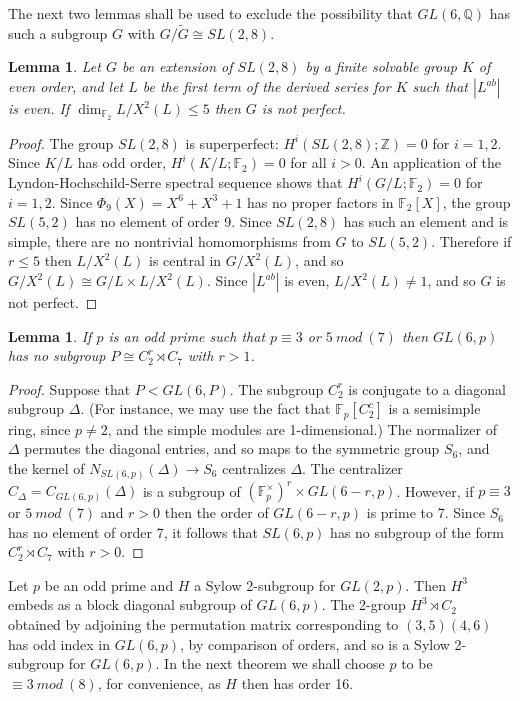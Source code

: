 \documentclass[12pt]{amsart}
\renewcommand{\leq}{\leqslant}
\newtheorem{lemma}[theorem]{Lemma}
\begin{document}
The next two lemmas shall be used to exclude the possibility that 
$GL(6,\mathbb{Q})$ has such a subgroup $G$ with $G/\widetilde{G}\cong{SL(2,8)}$.

\begin{lemma}
\label{small 2gp}
Let $G$ be an extension of $SL(2,8)$ by a finite solvable group $K$ 
of even order, and let $L$ be the first term of the derived series for $K$ 
such that $|L^{ab}|$ is even.
If $\dim_{\mathbb{F}_2}L/X^2(L)\leq5$ then $G$ is not perfect.
\end{lemma}

\begin{proof}
The group $SL(2,8)$ is superperfect: $H^i(SL(2,8);\mathbb{Z})=0$ for $i=1,2$.
Since $K/L$ has odd order,  $H^i(K/L;\mathbb{F}_2)=0$ for all $i>0$.
An application of the Lyndon-Hochschild-Serre spectral sequence shows that 
 $H^i(G/L;\mathbb{F}_2)=0$ for $i=1,2$.
Since $\Phi_9(X)=X^6+X^3+1$ has no proper factors in $\mathbb{F}_2[X]$,
the group $SL(5,2)$ has no element of order 9.
Since $SL(2,8)$ has such an element and is simple,
there are no nontrivial homomorphisms from $G$ to $SL(5,2)$.
Therefore if $r\leq5$ then $L/X^2(L)$ is central in $G/X^2(L)$,
and so $G/X^2(L)\cong{G/L}\times{L/X^2(L)}$.
Since $|L^{ab}|$ is even, $L/X^2(L)\not=1$, 
and so $G$ is not perfect.
\end{proof}

\begin{lemma}
\label{noC2rxC7}
If $p$ is an odd prime such that $p\equiv3$ or $5~mod~(7)$
then $GL(6,p)$ has no subgroup $P\cong{C_2^r}\rtimes{C_7}$ with $r>1$.
\end{lemma}

\begin{proof}
Suppose that $P<GL(6,P)$.
The subgroup $C_2^r$ is conjugate to a diagonal subgroup $\Delta$.
(For instance, 
we may use the fact that $\mathbb{F}_p[C_2^c]$ is a semisimple ring,
since $p\not=2$, and the simple modules are 1-dimensional.)
The normalizer of $\Delta$ permutes the diagonal entries, 
and so maps to the symmetric group $S_6$, and the kernel of $N_{SL(6,p)}(\Delta)\to{S_6}$ centralizes $\Delta$.
The centralizer $C_\Delta=C_{GL(6,p)}(\Delta)$ is a subgroup of 
$(\mathbb{F}_p^\times)^r\times{GL(6-r,p)}$.
However, if $p\equiv3$ or $5~mod~(7)$ and $r>0$ 
then the order of $GL(6-r,p)$ is prime to 7.
Since $S_6$ has no element of order 7, 
it follows that $SL(6,p)$ has no subgroup of the form
$C_2^r\rtimes{C_7}$ with $r>0$.
\end{proof}

Let $p$ be an odd prime and $H$ a Sylow 2-subgroup for $GL(2,p)$.
Then $H^3$ embeds as a block diagonal subgroup of $GL(6,p)$.
The 2-group ${H^3}\rtimes{C_2}$ obtained by
adjoining the permutation matrix corresponding to $(3,5)(4,6)$
has odd index in $GL(6,p)$, by comparison of orders, and so
is a Sylow 2-subgroup for $GL(6,p)$.
In the next theorem we shall choose $p$ to be $\equiv3~mod~(8)$, 
for convenience,  as $H$ then has order 16.
\end{document}
